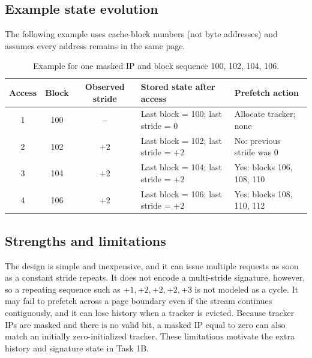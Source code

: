 \subsection{Example state evolution}
The following example uses cache-block numbers (not byte addresses) and assumes every address remains in the same page.
\begin{table}[H]\centering\small
\caption{Example for one masked IP and block sequence 100, 102, 104, 106.}
\begin{tabularx}{\linewidth}{c c c X X}
\toprule Access & Block & Observed stride & Stored state after access & Prefetch action \\
\midrule
1 & 100 & -- & Last block = 100; last stride = 0 & Allocate tracker; none \\
2 & 102 & $+2$ & Last block = 102; last stride = $+2$ & No: previous stride was 0 \\
3 & 104 & $+2$ & Last block = 104; last stride = $+2$ & Yes: blocks 106, 108, 110 \\
4 & 106 & $+2$ & Last block = 106; last stride = $+2$ & Yes: blocks 108, 110, 112 \\
\bottomrule
\end{tabularx}\end{table}

\subsection{Strengths and limitations}
The design is simple and inexpensive, and it can issue multiple requests as soon as a constant stride repeats. It does not encode a multi-stride signature, however, so a repeating sequence such as $+1,+2,+2,+2,+3$ is not modeled as a cycle. It may fail to prefetch across a page boundary even if the stream continues contiguously, and it can lose history when a tracker is evicted. Because tracker IPs are masked and there is no valid bit, a masked IP equal to zero can also match an initially zero-initialized tracker. These limitations motivate the extra history and signature state in Task 1B.
